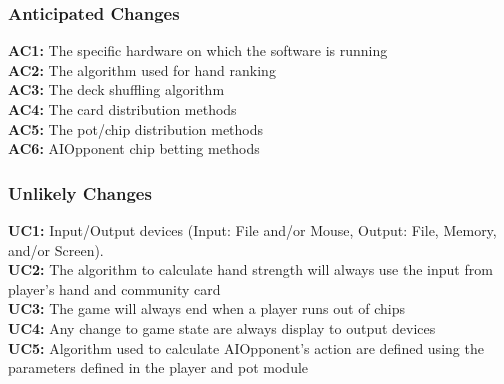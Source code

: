 \documentclass[11pt]{article}
\begin{document}
    \subsubsection{Anticipated Changes}
    \textbf{AC1:} The specific hardware on which the software is running\\
    \textbf{AC2:} The algorithm used for hand ranking\\
    \textbf{AC3:} The deck shuffling algorithm\\
    \textbf{AC4:} The card distribution methods\\
    \textbf{AC5:} The pot/chip distribution methods\\
    \textbf{AC6:} AIOpponent chip betting methods\\
    
     
    \subsubsection{Unlikely Changes}
    \textbf{UC1:} Input/Output devices (Input: File and/or Mouse, Output: File, Memory, and/or Screen).\\
    \textbf{UC2:} The algorithm to calculate hand strength will always use the input from player’s hand and community card\\
    \textbf{UC3:} The game will always end when a player runs out of chips\\
    \textbf{UC4:} Any change to game state are always display to output devices\\
    \textbf{UC5:} Algorithm used to calculate AIOpponent’s action are defined using the parameters defined in the player and pot module\\
    
\end{document}
